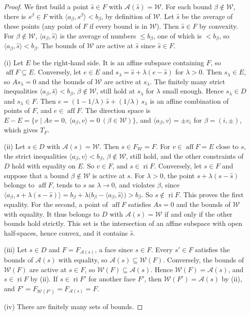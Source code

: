 \documentclass[11pt,a4paper]{article}
\numberwithin{equation}{section}
\theoremstyle{plain}
\theoremstyle{definition}
\theoremstyle{remark}
\newcommand{\inner}[2]{\langle #1,#2\rangle}
\newcommand{\ri}{\operatorname{ri}}
\newcommand{\aff}{\operatorname{aff}}
\newcommand{\calA}{\mathcal{A}}
\newcommand{\calW}{\mathcal{W}}
\begin{document}
\begin{proof}
We first build a point $\hat s\in F$ with $\calA(\hat s)=\calW$. For each bound $\beta\notin\calW$,
there is $s^\beta\in F$ with $\inner{a_\beta}{s^\beta}<b_\beta$, by definition of $\calW$. Let
$\hat s$ be the average of these points (any point of $F$ if every bound is in $\calW$). Then
$\hat s\in F$ by convexity. For $\beta\notin\calW$, $\inner{a_\beta}{\hat s}$ is the average of
numbers $\le b_\beta$, one of which is $<b_\beta$, so $\inner{a_\beta}{\hat s}<b_\beta$. The bounds
of $\calW$ are active at $\hat s$ since $\hat s\in F$.

(i) Let $E$ be the right-hand side. It is an affine subspace containing $F$, so
$\aff F\subseteq E$. Conversely, let $e\in E$ and $s_\lambda=\hat s+\lambda(e-\hat s)$ for
$\lambda>0$. Then $s_\lambda\in E$, so $As_\lambda=0$ and the bounds of $\calW$ are active at
$s_\lambda$. The finitely many strict inequalities $\inner{a_\beta}{\hat s}<b_\beta$,
$\beta\notin\calW$, still hold at $s_\lambda$ for $\lambda$ small enough. Hence $s_\lambda\in D$
and $s_\lambda\in F$. Then $e=(1-1/\lambda)\,\hat s+(1/\lambda)\,s_\lambda$ is an affine
combination of points of $F$, and $e\in\aff F$. The direction space is
$E-E=\{v\mid Av=0,\ \inner{a_\beta}{v}=0\ (\beta\in\calW)\}$, and
$\inner{a_\beta}{v}=\pm v_i$ for $\beta=(i,\pm)$, which gives $T_F$.

(ii) Let $s\in D$ with $\calA(s)=\calW$. Then $s\in F_\calW=F$. For $v\in\aff F=E$ close to $s$,
the strict inequalities $\inner{a_\beta}{v}<b_\beta$, $\beta\notin\calW$, still hold, and the
other constraints of $D$ hold with equality on $E$. So $v\in F$, and $s\in\ri F$. Conversely,
let $s\in F$ and suppose that a bound $\beta\notin\calW$ is active at $s$. For $\lambda>0$, the
point $s+\lambda(s-\hat s)$ belongs to $\aff F$, tends to $s$ as $\lambda\to0$, and violates
$\beta$, since
$\inner{a_\beta}{s+\lambda(s-\hat s)}=b_\beta+\lambda\big(b_\beta-\inner{a_\beta}{\hat s}\big)>b_\beta$.
So $s\notin\ri F$. This proves the first equality. For the second, a point of $\aff F$ satisfies
$As=0$ and the bounds of $\calW$ with equality. It thus belongs to $D$ with $\calA(s)=\calW$ if and
only if the other bounds hold strictly. This set is the intersection of an affine subspace with
open half-spaces, hence convex, and it contains $\hat s$.

(iii) Let $s\in D$ and $F=F_{\calA(s)}$, a face since $s\in F$. Every $s'\in F$ satisfies the
bounds of $\calA(s)$ with equality, so $\calA(s)\subseteq\calW(F)$. Conversely, the bounds of
$\calW(F)$ are active at $s\in F$, so $\calW(F)\subseteq\calA(s)$. Hence $\calW(F)=\calA(s)$, and
$s\in\ri F$ by (ii). If $s\in\ri F'$ for another face $F'$, then $\calW(F')=\calA(s)$ by (ii), and
$F'=F_{\calW(F')}=F_{\calA(s)}=F$.

(iv) There are finitely many sets of bounds.
\end{proof}
\end{document}
